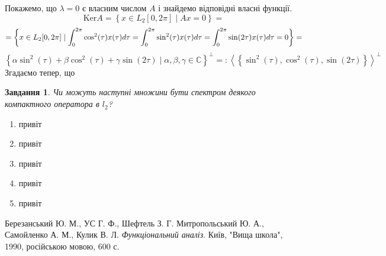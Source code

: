 \documentclass[12pt]{article} %
\newcommand{\mysetn}[2]{\left\{#1\mid #2\right\}}
\newtheorem{prob}{Завдання}
\begin{document}
Покажемо, що $\lambda=0$ є власним числом $A$ і знайдемо відповідні власні функції. 
\[\mbox{Ker} A=\mysetn{x\in L_2[0,2\pi]}{Ax=0}=\]\[=\mysetn{x\in L_2[0,2\pi]}{\myint{\cos^2(\tau)}=\myint{\sin^2(\tau)}=\myint{\sin(2\tau)}=0}=\]
\[\mysetn{\alpha\sin^2(\tau)+\beta\cos^2(\tau)+\gamma\sin(2\tau)
}{\alpha,\beta,\gamma\in\mathbb{C}}^\perp=:\left<\left\{\sin^2(\tau),\cos^2(\tau),\sin(2\tau)\right\}\right>^\perp\]
Згадаємо тепер, що 
\begin{prob}Чи можуть наступні множини бути спектром деякого компактного оператора в $l_2$?\end{prob}
\begin{enumerate}
	\renewcommand{\labelenumi}{\myralph{enumi})}
	\item{привіт}
	\item{привіт}
	\item{привіт}
	\item{привіт}
	\item{привіт}
\end{enumerate}
\begin{thebibliography}{9}
Березанський Ю. М., УС Г. Ф., Шефтель З. Г.
Митропольський Ю. А., Самойленко А. М., Кулик В. Л.
\emph{Функціональний аналіз}.
Київ, "Вища школа"{}, 1990, російською мовою, 600 с.
\end{thebibliography}
\end{document}
